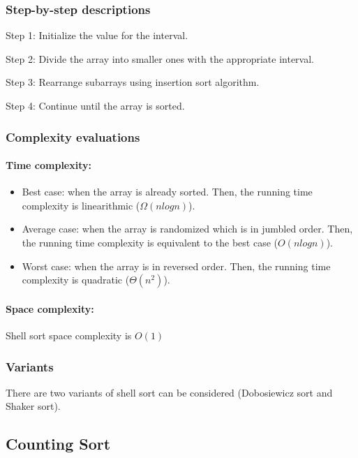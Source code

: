 \documentclass{article}
\newcommand\tab[1][0.5cm]{\hspace*{#1}}
\begin{document}
\subsubsection{Step-by-step descriptions}
\tab Step 1: Initialize the value for the interval.
\smallskip

Step 2: Divide the array into smaller ones with the appropriate interval.
\smallskip

Step 3: Rearrange subarrays using insertion sort algorithm.
\smallskip

Step 4: Continue until the array is sorted.
\subsubsection{Complexity evaluations}

\paragraph{\tab Time complexity:}
\begin{itemize}
    \item Best case: when the array is already sorted. Then, the running time complexity is linearithmic ($\Omega(nlogn)$).
    
    \item Average case: when the array is randomized which is in jumbled order. Then, the running time complexity is equivalent to the best case ($O(nlogn)$).
    
    \item Worst case: when the array is in reversed order. Then, the running time complexity is quadratic ($\Theta(n^2)$).
\end{itemize}

\paragraph{\tab Space complexity:}

Shell sort space complexity is $O(1)$ 

\subsubsection{Variants}

There are two variants of shell sort can be considered (Dobosiewicz sort and Shaker sort).

\pagebreak



\subsection{Counting Sort}
\end{document}
